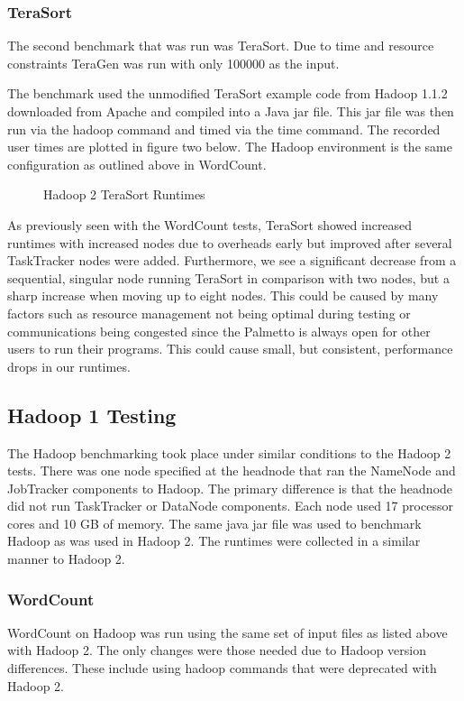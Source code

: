 \documentclass[conference]{IEEEtran}
\begin{document}
				\subsubsection{TeraSort}
					The second benchmark that was run was TeraSort. Due to time and resource constraints TeraGen was run with only 100000 as the input.

					The benchmark used the unmodified TeraSort example code from Hadoop 1.1.2 downloaded from Apache and compiled into a Java jar file. This jar file was then run via the hadoop command and timed via the time command. The recorded user times are plotted in figure two below. The Hadoop environment is the same configuration as outlined above in WordCount.
					\begin{figure}[h]
                   				\begin{center}
                       					
                        					\caption{Hadoop 2 TeraSort Runtimes}
                    				\end{center}
                  			\end{figure}

					As previously seen with the WordCount tests, TeraSort showed increased runtimes with increased nodes due to overheads early but improved after several TaskTracker nodes were added. Furthermore, we see a significant decrease from a sequential, singular node running TeraSort in comparison with two nodes, but a sharp increase when moving up to eight nodes. This could be caused by many factors such as resource management not being optimal during testing or communications being congested since the Palmetto is always open for other users to run their programs. This could cause small, but consistent, performance drops in our runtimes.
				\subsection{Hadoop 1 Testing}
					The Hadoop benchmarking took place under similar conditions to the Hadoop 2 tests. There was one node specified at the headnode that ran the NameNode and JobTracker components to Hadoop. The primary difference is that the headnode did not run TaskTracker or DataNode components. Each node used 17 processor cores and 10 GB of memory. The same java jar file was used to benchmark Hadoop as was used in Hadoop 2. The runtimes were collected in a similar manner to Hadoop 2.
					\subsubsection{WordCount}
					WordCount on Hadoop was run using the same set of input files as listed above with Hadoop 2. The only changes were those needed due to Hadoop version differences. These include using hadoop commands that were deprecated with Hadoop 2.
\end{document}
